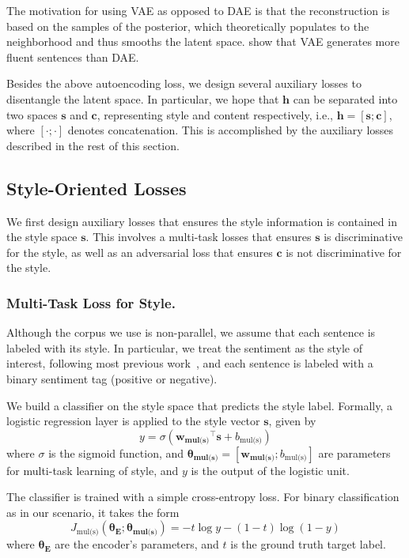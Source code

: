\documentclass[letterpaper]{article} %
\newcommand{\loss}[1]{J_{\text{#1}}}
\newcommand{\nnweight}[1]{\bm{\theta_{\text{#1}}}}
\newcommand{\weight}[1]{\bm{w_{\text{#1}}}}
\newcommand{\bias}[1]{b_{\text{#1}}}
\newcommand{\citeay}[1]{\citeauthor{#1} \shortcite{#1}}
\begin{document}
The motivation for using VAE as opposed to DAE is  that the reconstruction is based on the samples of the posterior, which theoretically populates to the neighborhood and thus smooths the latent space. \citeay{bowman2016generating} show that VAE generates more fluent sentences than DAE.

Besides the above autoencoding loss, we design several auxiliary losses to disentangle the latent space. In particular, we hope that $\bm h$ can be separated into two spaces $\bm s$ and $\bm c$, representing style and content respectively, i.e., $\bm h = [\bm s ; \bm c]$, where $[\cdot;\cdot]$ denotes concatenation.
This is accomplished by the auxiliary losses described in the rest of this section.


\subsection{Style-Oriented Losses}

We first design auxiliary losses that ensures the style information is contained in the style space $\bm s$. This involves a multi-task losses that ensures $\bm s$ is discriminative for the style, as well as an adversarial loss that ensures $\bm c$ is not discriminative for the style.

\subsubsection{Multi-Task Loss for Style.} \label{ssec:multitask-style-objective}
Although the corpus we use is non-parallel, we assume that each sentence is labeled with its style. In particular, we treat the sentiment as the style of interest, following most previous work~\cite{hu2017toward,shen2017style,fu2018style}, and each sentence is labeled with a binary sentiment tag (positive or negative).

We build a classifier on the style space that predicts the style label. Formally, a logistic regression layer is applied to the style vector $\bm s$, given by
\begin{equation} \label{eqn:class-pred}
	y = \sigma({\weight{mul(s)}}^\top \bm s + \bias{mul(s)})
\end{equation}
where $\sigma$ is the sigmoid function, and $\nnweight{mul(s)}=[\weight{mul(s)}; \bias{mul(s)}]$ are parameters for multi-task learning of style, and $y$ is the output of the logistic unit.

The classifier is trained with a simple cross-entropy loss. For binary classification as in our scenario, it takes the form
\begin{equation} \label{eqn:style-multi-task-loss}
	\loss{mul(s)}(\nnweight{E};\nnweight{mul(s)}) =
	- t \log y- (1-t)\log (1-y)
\end{equation}
where $\nnweight{E}$ are the encoder's parameters, and $t$ is the ground truth target label.
\end{document}
